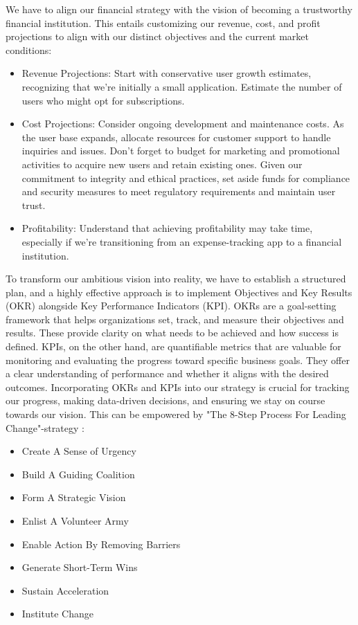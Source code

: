 We have to align our financial strategy with the vision of becoming a trustworthy financial institution. This entails 
customizing our revenue, cost, and profit projections to align with our distinct objectives and the current market 
conditions:

\begin{itemize}
  \item Revenue Projections: Start with conservative user growth estimates, recognizing that we're initially a small 
  application. Estimate the number of users who might opt for subscriptions.

  \item Cost Projections: Consider ongoing development and maintenance costs. As the user base expands, allocate 
  resources for customer support to handle inquiries and issues. Don't forget to budget for marketing and promotional 
  activities to acquire new users and retain existing ones. Given our commitment to integrity and ethical practices, 
  set aside funds for compliance and security measures to meet regulatory requirements and maintain user trust.

  \item Profitability: Understand that achieving profitability may take time, especially if we're transitioning from an 
  expense-tracking app to a financial institution.
\end{itemize}

\noindent To transform our ambitious vision into reality, we have to establish a structured plan, and a highly effective 
approach is to implement Objectives and Key Results (OKR) alongside Key Performance Indicators (KPI). OKRs are a 
goal-setting framework \cite{Doer18} that helps organizations set, track, and measure their objectives and results. 
These provide clarity on what needs to be achieved and how success is defined. KPIs, on the other hand, are quantifiable 
metrics \cite{Marr12} that are valuable for monitoring and evaluating the progress toward specific business goals. They 
offer a clear understanding of performance and whether it aligns with the desired outcomes. Incorporating OKRs and KPIs 
into our strategy is crucial for tracking our progress, making data-driven decisions, and ensuring we stay on course 
towards our vision. This can be empowered by "The 8-Step Process For Leading Change"-strategy \cite{Kott12}:

\begin{itemize}
  \item Create A Sense of Urgency
  \item Build A Guiding Coalition
  \item Form A Strategic Vision
  \item Enlist A Volunteer Army
  \item Enable Action By Removing Barriers
  \item Generate Short-Term Wins
  \item Sustain Acceleration
  \item Institute Change
\end{itemize}

